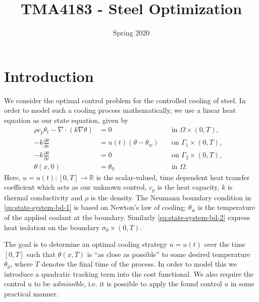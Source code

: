 \documentclass{article}
\title{TMA4183 - Steel Optimization}
\author{}
\date{Spring 2020}
\begin{document}
\maketitle

\section{Introduction}
We consider the optimal control problem for the controlled cooling of steel. In order to model such a cooling process mathematically, we use a linear heat equation as our state equation, given by
\begin{subequations}
   \label{eq:heat}
   \begin{align}
      \rho c_p \theta_t - \nabla \cdot (k \nabla \theta) &= 0 \quad &\text{in } \Omega \times (0,T),\label{eq:heat-in-omega} \\
      -k \frac{\partial \theta}{\partial \nu} &= u(t) (\theta - \theta_w) \quad &\text{on } \Gamma_1 \times (0,T), \label{eq:state-system-bd-1} \\
      -k \frac{\partial \theta}{\partial \nu} &= 0 \quad &\text{on } \Gamma_2 \times (0,T), \label{eq:state-system-bd-2} \\
      \theta(x, 0) &= \theta_0 &\text{in } \Omega. &
   \end{align}
\end{subequations}
Here, $u = u(t) \colon [0, T] \to \mathbb{R}$ is the scalar-valued, time dependent heat transfer coefficient which acts as our unknown control, $c_p$ is the heat capacity, $k$ is thermal conductivity and $\rho$ is the density. The Neumann boundary condition in \eqref{eq:state-system-bd-1} is based on Newton's law of cooling; $\theta_w$ is the temperature of the applied coolant at the boundary. Similarly \eqref{eq:state-system-bd-2} express heat isolation on the boundary $\sigma_0 \times (0,T)$. \bigskip 

The goal is to determine an optimal cooling strategy $u=u(t)$ over the time $[0,T]$ such that $\theta(x, T)$ is ``as close as possible'' to some desired temperature $\theta_d$, where $T$ denotes the final time of the process. In order to model this we introduce a quadratic tracking term into the cost functional. We also require the control $u$ to be \emph{admissible}, i.e. it is possible to apply the found control $u$ in some practical manner.
\end{document}
